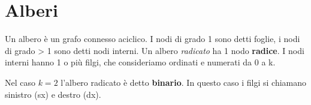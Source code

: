 \documentclass{article}
\begin{document}
\section{Alberi}

Un albero è un grafo connesso aciclico. I nodi di grado 1 sono detti foglie, i nodi di grado > 1 sono detti nodi interni.
Un albero \emph{radicato} ha 1 nodo \textbf{radice}.
I nodi interni hanno 1 o più filgi, che consideriamo ordinati e numerati da 0 a k.

Nel caso \(k = 2\) l'albero radicato è detto \textbf{binario}. In questo caso i filgi si chiamano sinistro (sx) e destro (dx).
\end{document}
